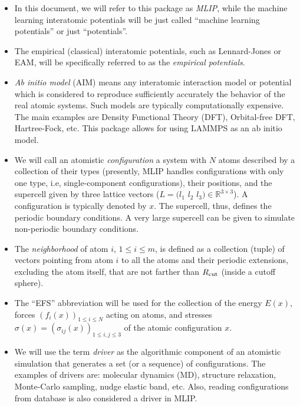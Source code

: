 \documentclass[12pt]{article}
\renewcommand{\_}{\char`_}
\begin{document}
\begin{itemize}
	\item In this document, we will refer to this package as \emph{MLIP}, while the machine learning interatomic potentials will be just called ``machine learning potentials'' or just ``potentials''. 
	
	\item The empirical (classical) interatomic potentials, such as Lennard-Jones or EAM, will be specifically referred to as the \emph{empirical potentials}.
	
	\item \emph{Ab initio model} (AIM) means any interatomic interaction model or potential which is considered to reproduce sufficiently accurately the behavior of the real atomic systems. Such models are typically computationally expensive. The main examples are Density Functional Theory (DFT), Orbital-free DFT, Hartree-Fock, etc.
	This package allows for using LAMMPS as an ab initio model.
	
	\item We will call an atomistic \emph{configuration} a system with $N$ atoms described by a collection of their types (presently, MLIP handles configurations with only one type, i.e, single-component configurations), their positions, and the supercell given by three lattice vectors ($L = \big(l_1 \,\, l_2 \,\, l_3\big)\in{\mathbb R}^{3\times 3}$).
	A configuration is typically denoted by $x$.
	The supercell, thus, defines the periodic boundary conditions.
	A very large supercell can be given to simulate non-periodic boundary conditions.
	
	\item The \emph{neighborhood} of atom $i$, $1\leq i\leq m$, is defined as a collection (tuple) of vectors pointing from atom $i$ to all the atoms and their periodic extensions, excluding the atom itself, that are not farther than $R_{\rm cut}$ (inside a cutoff sphere).
	
	\item The ``EFS'' abbreviation will be used for the collection of the energy $E(x)$, forces $(f_i(x))_{1\leq i\leq N}$ acting on atoms, and stresses $\sigma(x)=(\sigma_{ij}(x))_{1\leq i,j\leq 3}$ of the atomic configuration $x$.
	
	\item We will use the term \emph{driver} as the algorithmic component of an atomistic simulation that generates a set (or a sequence) of configurations.
	The examples of drivers are: molecular dynamics (MD), structure relaxation, Monte-Carlo sampling, nudge elastic band, etc.
	Also, reading configurations from database is also considered a driver in MLIP.
\end{itemize}
\end{document}
